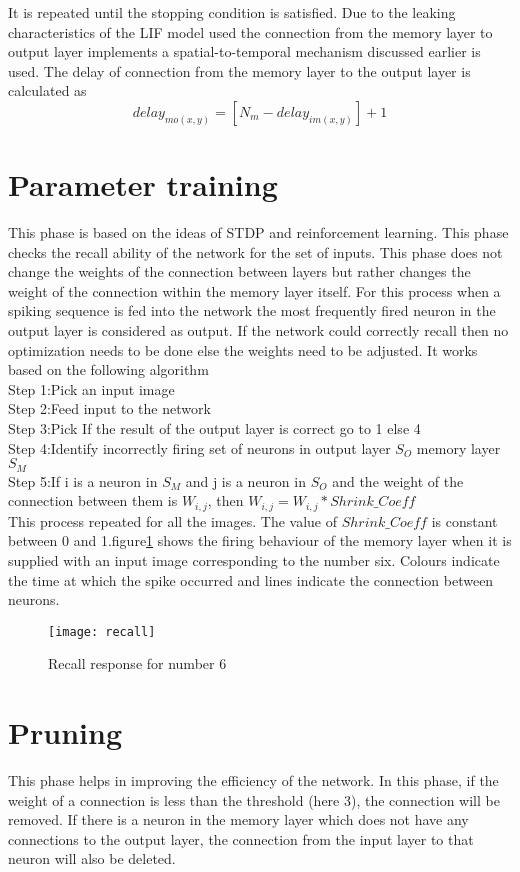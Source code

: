 It is repeated until the stopping condition is satisfied. Due to the leaking
characteristics of the LIF model used the connection from the memory layer to
output layer implements a spatial-to-temporal mechanism discussed earlier is
used. The delay of connection from the memory layer to the output layer is
calculated as
\begin{equation*}
    delay_{mo(x,y)}=[N_m-delay_{im(x,y)}]+1
\end{equation*}
\section{Parameter training}
This phase is based on the ideas of STDP and reinforcement learning. This phase
checks the recall ability of the network for the set of inputs. This phase does
not change the weights of the connection between layers but rather changes the
weight of the connection within the memory layer itself. For this process when
a spiking sequence is fed into the network the most frequently fired neuron in
the output layer is considered as output. If the network could correctly recall
then no optimization needs to be done else the weights need to be adjusted. It
works based on the following algorithm \\Step 1:Pick an input image\\ Step
2:Feed input to the network\\ Step 3:Pick If the result of the output layer is
correct go to 1 else 4\\ Step 4:Identify incorrectly firing set of neurons in
output layer $S_{O}$ memory layer $S_{M}$ \\ Step 5:If i is a neuron in $S_M$
and j is a neuron in $S_O$ and the weight of the connection between them is
$W_{i,j}$, then $W_{i,j}=W_{i,j}*Shrink\_Coeff$\\ This process repeated for all
the images. The value of $Shrink\_Coeff$ is constant between 0 and
1.figure\ref{recall} shows the firing behaviour of the memory layer when it is
supplied with an input image corresponding to the number six. Colours indicate
the time at which the spike occurred and lines indicate the connection between
neurons.
\begin{figure}[h!]
    \centering
    \texttt{[image: recall]}
    \caption{Recall response for number 6}\label{recall}
\end{figure}
\section{Pruning}
This phase helps in improving the efficiency of the network. In this phase, if
the weight of a connection is less than the threshold (here 3), the connection
will be removed. If there is a neuron in the memory layer which does not have
any connections to the output layer, the connection from the input layer to
that neuron will also be deleted.